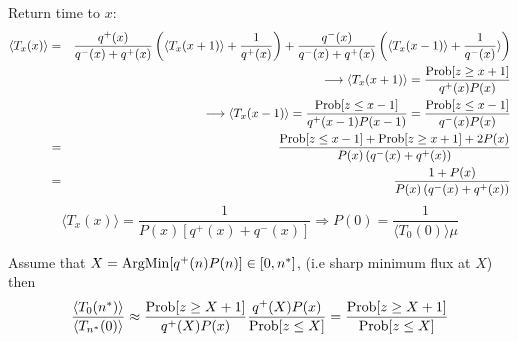 \documentclass[%
 amsmath,amssymb,
 reprint,%
]{revtex4-2}
\begin{document}
\begin{widetext}
Return time to $x$:
\begin{eqnarray}
\langle T_x(x)\rangle &=& \frac{q^+(x)}{q^-(x)+q^+(x)}\left( \langle T_x(x+1) \rangle + \frac{1}{q^+(x)} \right) + \frac{q^-(x)}{q^-(x)+q^+(x)}\left( \langle T_x(x-1) \rangle + \frac{1}{q^-(x)} \rangle \right)
\nonumber
\\ && \qquad \longrightarrow \langle T_x(x+1) \rangle = \frac{{\rm Prob}[z \geq x+1]}{q^+(x)P(x)}
\nonumber
\\ && \qquad \longrightarrow \langle T_x(x-1) \rangle = \frac{{\rm Prob}[z \leq x-1]}{q^+(x-1)P(x-1)}= \frac{{\rm Prob}[z \leq x-1]}{q^-(x)P(x)}
\nonumber
\\ &=& \frac{{\rm Prob}[z \leq x-1] + {\rm Prob}[z \geq x+1] + 2P(x)}{ P(x)\left( q^-(x)+q^+(x) \right)}
\nonumber
\\ &=& \frac{1+P(x)}{ P(x)\left( q^-(x)+q^+(x) \right)}
\end{eqnarray}
\begin{equation}
\langle T_x(x)\rangle = \frac{1}{P(x)[q^+(x)+q^-(x)]} \Rightarrow P(0)=\frac{1}{\langle T_0(0)\rangle \mu}
\end{equation}

Assume that $X={\rm ArgMin}[q^+(n)P(n)]\in [0,n^*]$, (i.e sharp minimum flux at $X$) then 
\begin{equation}
\frac{\langle T_0(n^*)\rangle }{\langle T_{n^*}(0)\rangle }\approx \frac{{\rm Prob}[z\geq X+1 ]}{q^+(X)P(x)}\frac{q^+(X)P(x)}{{\rm Prob}[z\leq X ]} =  \frac{{\rm Prob}[z\geq X+1 ]}{{\rm Prob}[z\leq X ]}
\end{equation}


\end{widetext}
\end{document}
